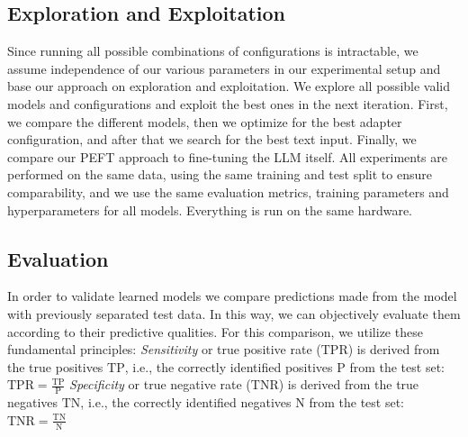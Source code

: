\documentclass[conference]{IEEEtran}
\begin{document}
\subsection{Exploration and Exploitation}%
Since running all possible combinations of configurations is intractable, we assume independence of our various parameters in our experimental setup and base our approach on exploration and exploitation. We explore all possible valid models and configurations and exploit the best ones in the next iteration. First, we compare the different models, then we optimize for the best adapter configuration, and after that we search for the best text input. Finally, we compare our PEFT approach to fine-tuning the LLM itself.
All experiments are performed on the same data, using the same training and test split to ensure comparability, and we use the same evaluation metrics, training parameters and hyperparameters for all models. Everything is run on the same hardware.

\subsection{Evaluation} %
In order to validate learned models we compare predictions made from the model with previously separated test data. In this way, we can objectively evaluate them according to their predictive qualities. For this comparison, we utilize these fundamental principles:
\newline \textit{Sensitivity} or true positive rate ($\mathrm{TPR}$) is derived from the true positives $\mathrm{TP}$,  i.e., the correctly identified positives $\mathrm{P}$ from the test set:
$
\mathrm{TPR}=\frac{\mathrm{TP}}{\mathrm{P}}
$
\newline \textit{Specificity} or true negative rate ($\mathrm{TNR}$) is derived from the true negatives $\mathrm{TN}$,  i.e., the correctly identified negatives $\mathrm{N}$ from the test set:
$
\mathrm{TNR}=\frac{\mathrm{TN}}{\mathrm{N}}
$
\end{document}
